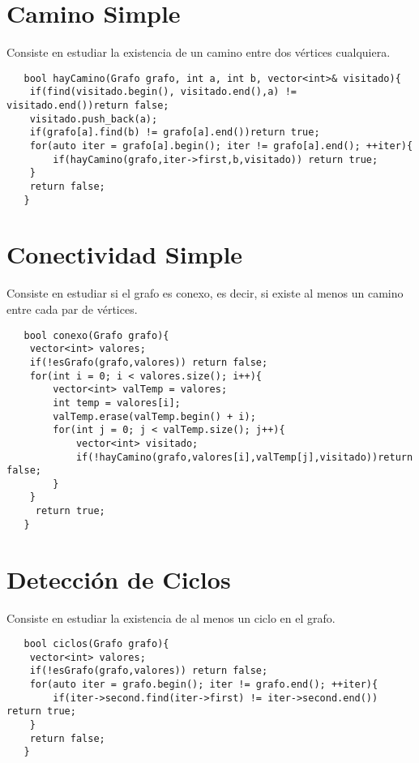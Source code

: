\documentclass[a4paper,12pt]{article}
\begin{document}
  \section{Camino Simple}
  Consiste en estudiar la existencia de un camino entre dos vértices cualquiera.
  \begin{lstlisting}
   bool hayCamino(Grafo grafo, int a, int b, vector<int>& visitado){
    if(find(visitado.begin(), visitado.end(),a) != visitado.end())return false;
    visitado.push_back(a);
    if(grafo[a].find(b) != grafo[a].end())return true;
    for(auto iter = grafo[a].begin(); iter != grafo[a].end(); ++iter){
        if(hayCamino(grafo,iter->first,b,visitado)) return true;
    }
    return false;
   }
  \end{lstlisting}

  \section{Conectividad Simple}
  Consiste en estudiar si el grafo es conexo, es decir, si existe al menos
  un camino entre cada par de vértices.
  \begin{lstlisting}
   bool conexo(Grafo grafo){
    vector<int> valores;
    if(!esGrafo(grafo,valores)) return false;
    for(int i = 0; i < valores.size(); i++){
        vector<int> valTemp = valores;
        int temp = valores[i];
        valTemp.erase(valTemp.begin() + i);
        for(int j = 0; j < valTemp.size(); j++){
            vector<int> visitado;
            if(!hayCamino(grafo,valores[i],valTemp[j],visitado))return false;
        }
    }
     return true;
   }
  \end{lstlisting}

  \section{Detección de Ciclos}
  Consiste en estudiar la existencia de al menos un ciclo en el grafo.
  \begin{lstlisting}
   bool ciclos(Grafo grafo){
    vector<int> valores;
    if(!esGrafo(grafo,valores)) return false;
    for(auto iter = grafo.begin(); iter != grafo.end(); ++iter){
        if(iter->second.find(iter->first) != iter->second.end()) return true;
    }
    return false;
   }
  \end{lstlisting}
\end{document}
